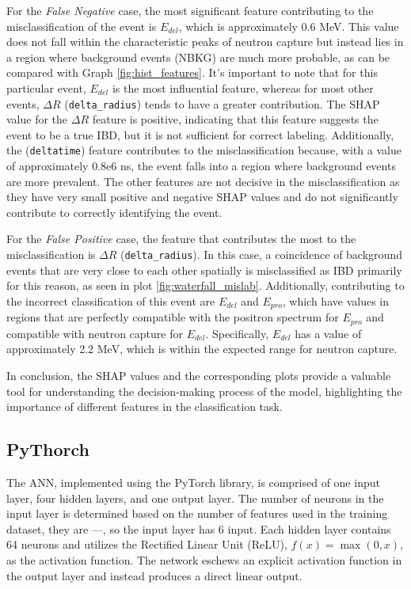 For the \textit{False Negative} case, the most significant feature contributing to the misclassification of the event is $E_{del}$, which is approximately 0.6 MeV. This value does not fall within the characteristic peaks of neutron capture but instead lies in a region where background events (NBKG) are much more probable, as can be compared with Graph \ref{fig:hist_features}. It's important to note that for this particular event, $E_{del}$ is the most influential feature, whereas for most other events, $\Delta R$ (\texttt{delta\_radius}) tends to have a greater contribution. The SHAP value for the $\Delta R$ feature is positive, indicating that this feature suggests the event to be a true IBD, but it is not sufficient for correct labeling. Additionally, the (\texttt{deltatime}) feature contributes to the misclassification because, with a value of approximately 0.8e6 ns, the event falls into a region where background events are more prevalent. The other features are not decisive in the misclassification as they have very small positive and negative SHAP values and do not significantly contribute to correctly identifying the event.

For the \textit{False Positive} case, the feature that contributes the most to the misclassification is $\Delta R$ (\texttt{delta\_radius}). In this case, a coincidence of background events that are very close to each other spatially is misclassified as IBD primarily for this reason, as seen in plot \ref{fig:waterfall_mislab}. Additionally, contributing to the incorrect classification of this event are $E_{del}$ and $E_{pro}$, which have values in regions that are perfectly compatible with the positron spectrum for $E_{pro}$ and compatible with neutron capture for $E_{del}$. Specifically, $E_{del}$ has a value of approximately 2.2 MeV, which is within the expected range for neutron capture.


In conclusion, the SHAP values and the corresponding plots provide a valuable tool for understanding the decision-making process of the model, highlighting the importance of different features in the classification task. 


\subsection{PyThorch}
The ANN, implemented using the PyTorch library, is comprised of one input layer, four hidden layers, and one output layer. The number of neurons in the input layer is determined based on the number of features used in the training dataset, they are ---, so the input layer has 6 input. Each hidden layer contains 64 neurons and utilizes the Rectified Linear Unit (ReLU), $ f(x) = \max(0, x) $, as the activation function. The network eschews an explicit activation function in the output layer and instead produces a direct linear output.

